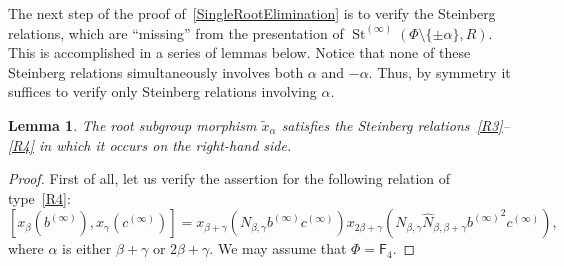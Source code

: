 \documentclass{article}
\numberwithin{equation}{section}
\newtheorem{lemma}{Lemma} \numberwithin{lemma}{section}
\theoremstyle{definition}
\theoremstyle{remark}
\DeclareMathOperator\St{St}
\newcommand{\rF}{\mathsf{F}}
\begin{document}
The next step of the proof of~\cref{SingleRootElimination} is to verify the Steinberg relations, which are ``missing'' from the presentation of $\St^{(\infty)}(\Phi\setminus\{\pm\alpha\}, R)$.
This is accomplished in a series of lemmas below.
Notice that none of these Steinberg relations simultaneously involves both \(\alpha\) and \(-\alpha\).
Thus, by symmetry it suffices to verify only Steinberg relations involving \(\alpha\).

\begin{lemma} \label{lem:elim-rhs}
 The root subgroup morphism $\widetilde{x}_\alpha$ satisfies the Steinberg relations~\eqref{R3}--\eqref{R4} in which it occurs on the right-hand side.
\end{lemma}
\begin{proof}
First of all, let us verify the assertion for the following relation of type~\eqref{R4}:
\[[x_{\beta}(b^{(\infty)}), x_\gamma(c^{(\infty)})] = x_{\beta + \gamma}(N_{\beta, \gamma}b^{(\infty)}c^{(\infty)}) x_{2\beta + \gamma}(N_{\beta,\gamma}\widehat{N}_{\beta,\beta+\gamma}{b^{(\infty)}}^2c^{(\infty)}),\]
where $\alpha$ is either $\beta + \gamma$ or $2\beta+\gamma$. We may assume that $\Phi = \rF_4$.


\end{proof}
\end{document}
